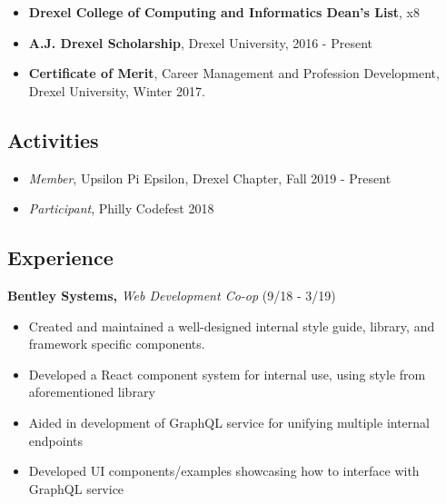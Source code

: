 \documentclass[10pt]{article}
\begin{document}
\begin{multicols}{2}
\vspace{-\topsep}
\begin{itemize}[leftmargin=*,noitemsep,topsep=0pt]
\item \textbf{Drexel College of Computing and Informatics Dean's List}, x8
\item \textbf{A.J. Drexel Scholarship}, Drexel University, 2016 - Present
\item \textbf{Certificate of Merit}, Career Management and Profession Development, Drexel University, Winter 2017.
\end{itemize}

\vspace{-\topsep}
\subsection*{Activities}%
\label{sub:Activities}

\vspace{-\topsep}
\begin{itemize}[leftmargin=*,noitemsep,topsep=0pt]
\item \emph{Member}, Upsilon Pi Epsilon, Drexel Chapter, Fall 2019 - Present
\item \emph{Participant}, Philly Codefest 2018
\end{itemize}

\vfill\null
\end{multicols}

\vspace{-3.5em}
\subsection*{Experience}%
\label{sub:Experience}

\vspace{-0.5em}
\textbf{Bentley Systems,}
\emph{Web Development Co-op}
(9/18 - 3/19)

\vspace{-\topsep}
\begin{itemize}
\setlength\itemsep{-0.5em}
\item Created and maintained a well-designed internal style
	guide, library, and framework specific components.
\item  Developed a React component system for internal use, using style
	from aforementioned library
\item Aided in development of GraphQL service for unifying
multiple internal endpoints
\item Developed UI components/examples showcasing how to
interface with GraphQL service
\end{itemize}
\end{document}
